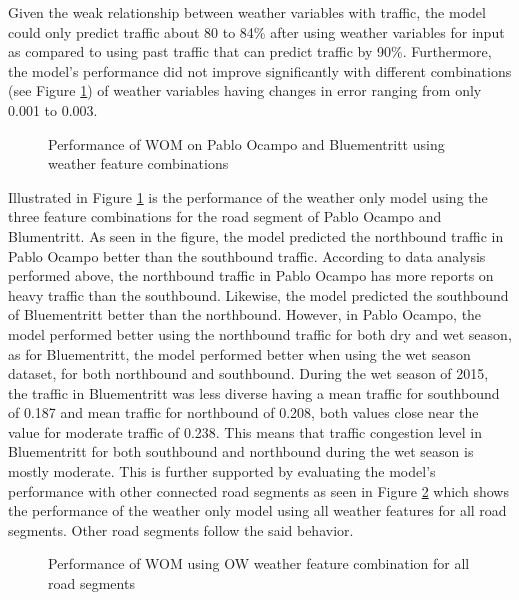 Given the weak relationship between weather variables with traffic, the model could only predict traffic about 80 to 84\% after using weather variables for input as compared to using past traffic that can predict traffic by 90\%. Furthermore, the model’s performance did not improve significantly with different combinations (see Figure \ref{fig:wom_diff_feat_combi}) of weather variables having changes in error ranging from only 0.001 to 0.003. 

\begin{figure}
  \centering
  \captionsetup{justification=centering}
  \caption{Performance of WOM on Pablo Ocampo and Bluementritt using weather feature combinations}
  \label{fig:wom_diff_feat_combi}
\end{figure}

Illustrated in Figure \ref{fig:wom_diff_feat_combi} is the performance of the weather only model using the three feature combinations for the road segment of Pablo Ocampo and Blumentritt. As seen in the figure, the model predicted the northbound traffic in Pablo Ocampo better than the southbound traffic. According to data analysis performed above, the northbound traffic in Pablo Ocampo has more reports on heavy traffic than the southbound. Likewise, the model predicted the southbound of Bluementritt better than the northbound. However, in Pablo Ocampo, the model performed better using the northbound traffic for both dry and wet season, as for Bluementritt, the model performed better when using the wet season dataset, for both northbound and southbound. During the wet season of 2015, the traffic in Bluementritt was less diverse having a mean traffic for southbound of 0.187 and mean traffic for northbound of 0.208, both values close near the value for moderate traffic of 0.238. This means that traffic congestion level in Bluementritt for both southbound and northbound during the wet season is mostly moderate. This is further supported by evaluating the model’s performance with other connected road segments as seen in Figure \ref{fig:wom_feat_combi_roads} which shows the performance of the weather only model using all weather features for all road segments. Other road segments follow the said behavior.

\begin{figure}
  \centering
  \captionsetup{justification=centering}
  \caption{Performance of WOM using OW weather feature combination for all road segments}
  \label{fig:wom_feat_combi_roads}
\end{figure}



